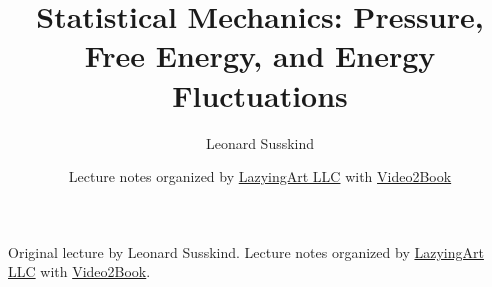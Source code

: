 \documentclass[11pt,oneside]{book}
\begin{document}
\frontmatter
\hypersetup{pageanchor=false}
\title{Statistical Mechanics: Pressure, Free Energy, and Energy Fluctuations}
\author{Leonard Susskind}
\date{Lecture notes organized by \href{https://lazying.art}{LazyingArt LLC} with \href{https://github.com/lachlanchen/Video2Book}{Video2Book}}
\maketitle
\begin{center}
\small Original lecture by Leonard Susskind. Lecture notes organized by \href{https://lazying.art}{LazyingArt LLC} with \href{https://github.com/lachlanchen/Video2Book}{Video2Book}.
\end{center}
\clearpage
\hypersetup{pageanchor=true}
\mainmatter

\end{document}
